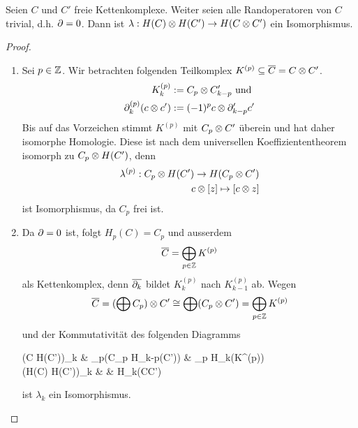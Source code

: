 \begin{lemma}
  Seien $C$ und $C'$ freie Kettenkomplexe. Weiter seien alle Randoperatoren von $C$ trivial, d.h. $\partial =0$. Dann ist $\lambda : H(C) \otimes H(C') \rightarrow H(C \otimes C')$ ein Isomorphismus.
\end{lemma}
\begin{proof}
\begin{enumerate}
	\item Sei $p \in \mathbb{Z}$. Wir betrachten folgenden Teilkomplex $K^{(p)} \subseteq \overline{C} = C \otimes C'$.
	\begin{align*}
	K^{(p)}_{k} &:= C_p \otimes C'_{k-p} \text{ und } \\
	\partial^{(p)}_k (c \otimes c') &:= (-1)^pc \otimes \partial'_{k-p}c'
	\end{align*}
	Bis auf das Vorzeichen stimmt $K^{(p)}$ mit $C_p \otimes C'$ überein und hat daher isomorphe Homologie.
	Diese ist nach dem universellen Koeffiziententheorem isomorph zu $C_p \otimes H(C')$, denn
	\begin{align*}
	\lambda^{(p)} : C_p \otimes H(C') \rightarrow H(C_p \otimes C') \\
	c \otimes [z] \mapsto [c \otimes z]
	\end{align*}
	ist Isomorphismus, da $C_p$ frei ist.
	\item Da $\partial = 0$ ist, folgt $H_p(C) = C_p$  und ausserdem
	\begin{equation*}
		\overline{C} = \bigoplus_{p \in \mathbb{Z}} K^{(p)}
	\end{equation*}
	als Kettenkomplex, denn $\overline{\partial_k}$ bildet $K^{(p)}_k$ nach $K^{(p)}_{k-1}$ ab.
	Wegen
	\begin{equation*}
		\overline{C} = (\bigoplus C_p) \otimes C' \cong \bigoplus(C_p \otimes C') = \bigoplus_{p \in \mathbb{Z}} K^{(p)}
	\end{equation*}
	und der Kommutativität des folgenden Diagramms
	
	\begin{cd*}
	(C \tensor H(C'))_k \ar[d, "\cong"] \ar[r, "="]
	& \bigoplus_{p}(C_p \tensor H_{k-p}(C')) 
	& \bigoplus_p H_k(K^{(p)}) \ar[d, "\cong"] \\
	(H(C) \tensor H(C'))_k \ar[rr, "\lambda_k"] &   & H_k(C\tensor C')
	\end{cd*}
	ist $\lambda_k$ ein Isomorphismus.
\end{enumerate}
\end{proof}

